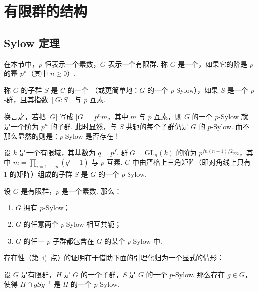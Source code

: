 \chapter{有限群的结构}\label{chap:fg-3}
\section{Sylow 定理}\label{sec:fg-3-1}

在本节中，$p$ 恒表示一个素数，$G$ 表示一个有限群. 称 $G$ 是一个，如果它的阶是 $p$ 的幂 $p^n$（其中 $n\geqslant0$）.

\begin{definition}\label{def:fg-3-1-1}
称 $G$ 的子群 $S$ 是 $G$ 的一个 （或更简单地：$G$ 的一个 $p$-Sylow），如果 $S$ 是一个 $p$-群，且其指数 $[G:S]$ 与 $p$ 互素.
\end{definition}

换言之，若把 $|G|$ 写成 $|G|=p^nm$，其中 $m$ 与 $p$ 互素，则 $G$ 的一个 $p$-Sylow 就是一个阶为 $p^n$ 的子群. 此时显然，与 $S$ 共轭的每个子群仍是 $G$ 的 $p$-Sylow. 而不那么显然的则是：$p$-Sylow 是否存在！

\begin{example}\label{ex:fg-3-1-2}
设 $k$ 是一个有限域，其基数为 $q=p^f$. 群 $G=\mathrm{GL}_n(k)$ 的阶为 $p^{fn(n-1)/2}m$，其中 $m=\prod_{i=1,\dots,n}(q^i-1)$ 与 $p$ 互素. $G$ 中由严格上三角矩阵（即对角线上只有 $1$ 的矩阵）组成的子群 $S$ 是 $G$ 的一个 $p$-Sylow.
\end{example}

\begin{theorem}\label{thm:fg-3-1-3}
设 $G$ 是有限群，$p$ 是一个素数. 那么：
\begin{enumerate}[label=\roman*)]
\item $G$ 拥有 $p$-Sylow；
\item $G$ 的任意两个 $p$-Sylow 相互共轭；
\item $G$ 的任一 $p$-子群都包含在 $G$ 的某个 $p$-Sylow 中.
\end{enumerate}
\end{theorem}

存在性（第~i)~点）的证明在于借助下面的引理化归为一个显式的情形：

\begin{lemma}\label{lemma:fg-3-1-4}
设 $G$ 是有限群，$H$ 是 $G$ 的一个子群，$S$ 是 $G$ 的一个 $p$-Sylow. 那么存在 $g\in G$，使得 $H\cap gSg^{-1}$ 是 $H$ 的一个 $p$-Sylow.
\end{lemma}

